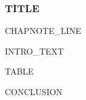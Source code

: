 %
%

\begin{frame}
  \frametitle{{{TITLE}}}
  {{CHAPNOTE_LINE}}
  \vskip0.1cm

  {{INTRO_TEXT}}

  \vskip0.15cm
  \begin{center}\small
  \setlength{\tabcolsep}{4pt}
  {{TABLE}}
  \end{center}

  \vskip0.2cm
  \small
  {{CONCLUSION}}
\end{frame}

%

